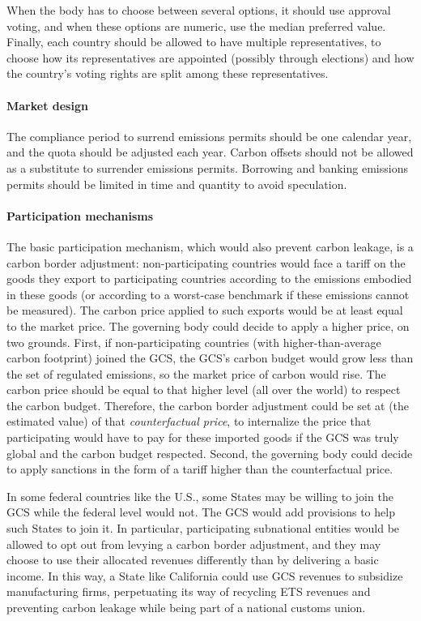 \documentclass[12pt,english]{article}
\begin{document}
When the body has to choose between several options, it should use approval voting, and when these options are numeric, use the median preferred value. Finally, each country should be allowed to have multiple representatives, to choose how its representatives are appointed (possibly through elections) and how the country's voting rights are split among these representatives. 

\paragraph{Market design} 
The compliance period to surrend emissions permits should be one calendar year, and the quota should be adjusted each year. Carbon offsets should not be allowed as a substitute to surrender emissions permits. Borrowing and banking emissions permits should be limited in time and quantity to avoid speculation. %

\paragraph{Participation mechanisms}

The basic participation mechanism, which would also prevent carbon leakage, is a carbon border adjustment: non-participating countries would face a tariff on the goods they export to participating countries according to the emissions embodied in these goods (or according to a worst-case benchmark if these emissions cannot be measured). The carbon price applied to such exports would be at least equal to the market price. The governing body could decide to apply a higher price, on two grounds. First, if non-participating countries (with higher-than-average carbon footprint) joined the GCS, the GCS's carbon budget would grow less than the set of regulated emissions, so the market price of carbon would rise. The carbon price should be equal to that higher level (all over the world) to respect the carbon budget. Therefore, the carbon border adjustment could be set at (the estimated value) of that \textit{counterfactual price}, to internalize the price that participating would have to pay for these imported goods if the GCS was truly global and the carbon budget respected. Second, the governing body could decide to apply sanctions in the form of a tariff higher than the counterfactual price. 

In some federal countries like the U.S., some States may be willing to join the GCS while the federal level would not. The GCS would add provisions to help such States to join it. In particular, participating subnational entities would be allowed to opt out from levying a carbon border adjustment, and they may choose %
to use their allocated revenues differently than by delivering a basic income. 
In this way, a State like California could use GCS revenues to subsidize manufacturing firms, perpetuating its way of recycling ETS revenues and preventing carbon leakage while being part of a national customs union. 
\end{document}
